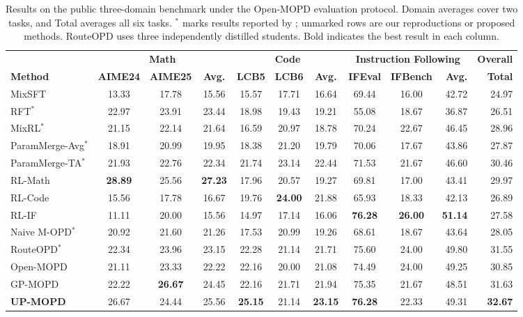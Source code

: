 \documentclass{article}
\begin{document}
\begin{table}[t]
\centering
\caption{Results on the public three-domain benchmark under the Open-MOPD evaluation protocol. Domain averages cover two tasks, and Total averages all six tasks. $^*$ marks results reported by \citet{ref3}; unmarked rows are our reproductions or proposed methods. RouteOPD uses three independently distilled students. Bold indicates the best result in each column.}
\label{tab:public}
\renewcommand{\arraystretch}{1.12}
\setlength{\tabcolsep}{3pt}
\footnotesize
\begin{tabularx}{\linewidth}{@{}>{\raggedright\arraybackslash}X*{7}{c}c*{2}{r}@{}}
\toprule
& \multicolumn{3}{c}{\textbf{Math}}
& \multicolumn{3}{c}{\textbf{Code}}
& \multicolumn{3}{c}{\textbf{Instruction Following}}
& \textbf{Overall} \\
\cmidrule(lr){2-4}\cmidrule(lr){5-7}\cmidrule(lr){8-10}\cmidrule(lr){11-11}
\textbf{Method} & \textbf{AIME24} & \textbf{AIME25} & \textbf{Avg.}
& \textbf{LCB5} & \textbf{LCB6} & \textbf{Avg.}
& \textbf{IFEval} & \textbf{IFBench} & \textbf{Avg.} & \textbf{Total} \\
\midrule
MixSFT & 13.33 & 17.78 & 15.56 & 15.57 & 17.71 & 16.64 & 69.44 & 16.00 & 42.72 & 24.97 \\
RFT$^*$ & 22.97 & 23.91 & 23.44 & 18.98 & 19.43 & 19.21 & 55.08 & 18.67 & 36.87 & 26.51 \\
MixRL$^*$ & 21.15 & 22.14 & 21.64 & 16.59 & 20.97 & 18.78 & 70.24 & 22.67 & 46.45 & 28.96 \\
ParamMerge-Avg$^*$ & 18.91 & 20.99 & 19.95 & 18.38 & 21.20 & 19.79 & 70.06 & 17.67 & 43.86 & 27.87 \\
ParamMerge-TA$^*$ & 21.93 & 22.76 & 22.34 & 21.74 & 23.14 & 22.44 & 71.53 & 21.67 & 46.60 & 30.46 \\
\midrule
RL-Math & \textbf{28.89} & 25.56 & \textbf{27.23} & 17.96 & 20.57 & 19.27 & 69.81 & 17.00 & 43.41 & 29.97 \\
RL-Code & 15.56 & 17.78 & 16.67 & 19.76 & \textbf{24.00} & 21.88 & 65.93 & 18.33 & 42.13 & 26.89 \\
RL-IF & 11.11 & 20.00 & 15.56 & 14.97 & 17.14 & 16.06 & \textbf{76.28} & \textbf{26.00} & \textbf{51.14} & 27.58 \\
\midrule
Naive M-OPD$^*$ & 20.92 & 21.60 & 21.26 & 17.53 & 20.99 & 19.26 & 68.61 & 18.67 & 43.64 & 28.05 \\
RouteOPD$^*$ & 22.34 & 23.96 & 23.15 & 22.28 & 21.14 & 21.71 & 75.60 & 24.00 & 49.80 & 31.55 \\
Open-MOPD & 21.11 & 23.33 & 22.22 & 22.16 & 20.00 & 21.08 & 74.49 & 24.00 & 49.25 & 30.85 \\
\midrule
GP-MOPD & 22.22 & \textbf{26.67} & 24.45 & 22.16 & 21.71 & 21.94 & 75.35 & 21.67 & 48.51 & 31.63 \\
\rowcolor{uprow}\textbf{UP-MOPD} & 26.67 & 24.44 & 25.56 & \textbf{25.15} & 21.14 & \textbf{23.15} & \textbf{76.28} & 22.33 & 49.31 & \textbf{32.67} \\
\bottomrule
\end{tabularx}
\end{table}
\end{document}
